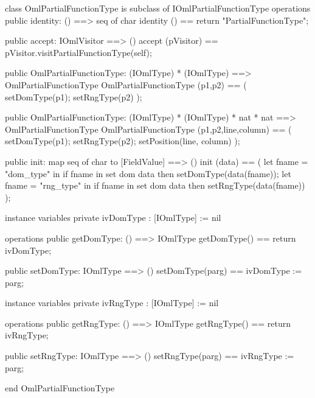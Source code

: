 \begin{vdm_al}
class OmlPartialFunctionType is subclass of IOmlPartialFunctionType
operations
  public identity: () ==> seq of char
  identity () == return "PartialFunctionType";

  public accept: IOmlVisitor ==> ()
  accept (pVisitor) == pVisitor.visitPartialFunctionType(self);

  public OmlPartialFunctionType:
    (IOmlType) *
    (IOmlType) ==> OmlPartialFunctionType
  OmlPartialFunctionType (p1,p2) == 
    ( setDomType(p1);
      setRngType(p2) );

  public OmlPartialFunctionType:
    (IOmlType) *
    (IOmlType) *
    nat *
    nat ==> OmlPartialFunctionType
  OmlPartialFunctionType (p1,p2,line,column) == 
    ( setDomType(p1);
      setRngType(p2);
      setPosition(line, column) );

  public init: map seq of char to [FieldValue] ==> ()
  init (data) ==
    ( let fname = "dom_type" in
        if fname in set dom data
        then setDomType(data(fname));
      let fname = "rng_type" in
        if fname in set dom data
        then setRngType(data(fname)) );

instance variables
  private ivDomType : [IOmlType] := nil

operations
  public getDomType: () ==> IOmlType
  getDomType() == return ivDomType;

  public setDomType: IOmlType ==> ()
  setDomType(parg) == ivDomType := parg;

instance variables
  private ivRngType : [IOmlType] := nil

operations
  public getRngType: () ==> IOmlType
  getRngType() == return ivRngType;

  public setRngType: IOmlType ==> ()
  setRngType(parg) == ivRngType := parg;

end OmlPartialFunctionType
\end{vdm_al}


